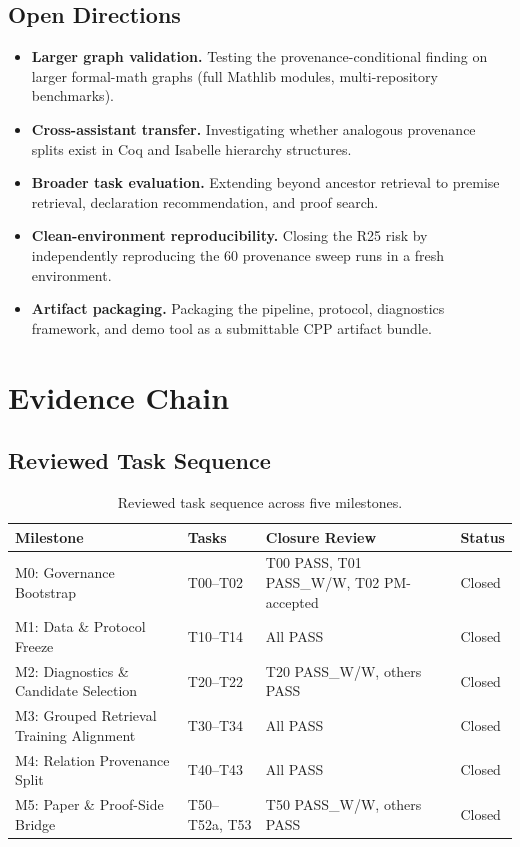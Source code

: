 \documentclass[runningheads]{llncs}
\begin{document}
\subsection*{Open Directions}

\begin{itemize}
\item \textbf{Larger graph validation.} Testing the provenance-conditional finding on larger formal-math graphs (full Mathlib modules, multi-repository benchmarks).
\item \textbf{Cross-assistant transfer.} Investigating whether analogous provenance splits exist in Coq and Isabelle hierarchy structures.
\item \textbf{Broader task evaluation.} Extending beyond ancestor retrieval to premise retrieval, declaration recommendation, and proof search.
\item \textbf{Clean-environment reproducibility.} Closing the R25 risk by independently reproducing the 60 provenance sweep runs in a fresh environment.
\item \textbf{Artifact packaging.} Packaging the pipeline, protocol, diagnostics framework, and demo tool as a submittable CPP artifact bundle.
\end{itemize}




\appendix

\section{Evidence Chain}

\subsection{Reviewed Task Sequence}

\begin{table}[h]
\centering
\caption{Reviewed task sequence across five milestones.}
\begin{tabular}{llll}
\toprule
Milestone & Tasks & Closure Review & Status \\
\midrule
M0: Governance Bootstrap & T00--T02 & T00 PASS, T01 PASS\_W/W, T02 PM-accepted & Closed \\
M1: Data \& Protocol Freeze & T10--T14 & All PASS & Closed \\
M2: Diagnostics \& Candidate Selection & T20--T22 & T20 PASS\_W/W, others PASS & Closed \\
M3: Grouped Retrieval Training Alignment & T30--T34 & All PASS & Closed \\
M4: Relation Provenance Split & T40--T43 & All PASS & Closed \\
M5: Paper \& Proof-Side Bridge & T50--T52a, T53 & T50 PASS\_W/W, others PASS & Closed \\
\bottomrule
\end{tabular}
\end{table}
\end{document}
